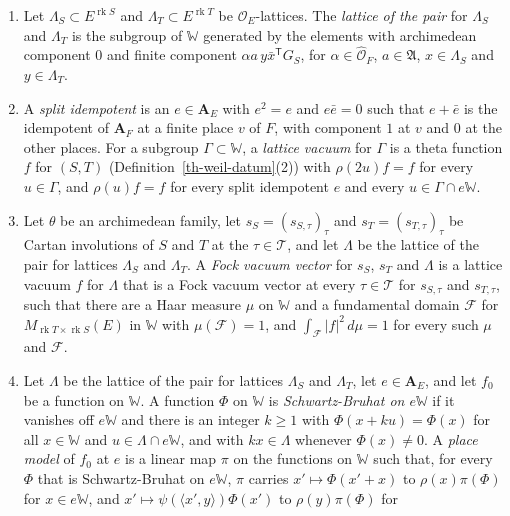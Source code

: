 \begin{definition}
\begin{enumerate}
{  $\tau$} for $s_S$ and $s_T$ if $a_\tau(z)f=0$ for every $z$.
\item Let $\Lambda_S\subset E^{\operatorname{rk}S}$ and
  $\Lambda_T\subset E^{\operatorname{rk}T}$ be $\mathcal O_E$-lattices. The
  \emph{lattice of the pair} for $\Lambda_S$ and $\Lambda_T$ is the subgroup of
  $\mathbb W$ generated by the elements with archimedean component $0$ and
  finite component $\alpha a\,y\bar x^{\mathsf T}G_S$, for
  $\alpha\in\hat{\mathcal O}_F$, $a\in\mathfrak A$, $x\in\Lambda_S$ and
  $y\in\Lambda_T$.
\item A \emph{split idempotent} is an $e\in\mathbf A_E$ with $e^2=e$ and
  $e\bar e=0$ such that $e+\bar e$ is the idempotent of $\mathbf A_F$ at a finite
  place $v$ of $F$, with component $1$ at $v$ and $0$ at the other places. For a
  subgroup $\Gamma\subset\mathbb W$, a \emph{lattice vacuum} for $\Gamma$ is a
  theta function $f$ for $(S,T)$ (Definition~\ref{th-weil-datum}(2)) with
  $\rho(2u)f=f$ for every $u\in\Gamma$, and $\rho(u)f=f$ for every split
  idempotent $e$ and every $u\in\Gamma\cap e\mathbb W$.
\item Let $\theta$ be an archimedean family, let $s_S=(s_{S,\tau})_\tau$ and
  $s_T=(s_{T,\tau})_\tau$ be Cartan involutions of $S$ and $T$ at the
  $\tau\in\mathcal T$, and let $\Lambda$ be the lattice of the pair for lattices
  $\Lambda_S$ and $\Lambda_T$. A \emph{Fock vacuum vector} for $s_S$, $s_T$ and
  $\Lambda$ is a lattice vacuum $f$ for $\Lambda$ that is a Fock vacuum vector
  at every $\tau\in\mathcal T$ for $s_{S,\tau}$ and $s_{T,\tau}$, such that there
  are a Haar measure $\mu$ on $\mathbb W$ and a fundamental domain $\mathcal F$
  for $M_{\operatorname{rk}T\times\operatorname{rk}S}(E)$ in $\mathbb W$ with
  $\mu(\mathcal F)=1$, and $\int_{\mathcal F}|f|^2\,d\mu=1$ for every such $\mu$
  and $\mathcal F$.
\item Let $\Lambda$ be the lattice of the pair for lattices $\Lambda_S$ and
  $\Lambda_T$, let $e\in\mathbf A_E$, and let $f_0$ be a function on
  $\mathbb W$. A function $\Phi$ on $\mathbb W$ is \emph{Schwartz-Bruhat on
  $e\mathbb W$} if it vanishes off $e\mathbb W$ and there is an integer
  $k\geq1$ with $\Phi(x+ku)=\Phi(x)$ for all $x\in\mathbb W$ and
  $u\in\Lambda\cap e\mathbb W$, and with $kx\in\Lambda$ whenever
  $\Phi(x)\neq0$. A \emph{place model} of $f_0$ at $e$ is a linear map $\pi$
  on the functions on $\mathbb W$ such that, for every $\Phi$ that is
  Schwartz-Bruhat on $e\mathbb W$, $\pi$ carries $x'\mapsto\Phi(x'+x)$ to
  $\rho(x)\pi(\Phi)$ for $x\in e\mathbb W$, and
  $x'\mapsto\psi(\langle x',y\rangle)\Phi(x')$ to $\rho(y)\pi(\Phi)$ for

\end{enumerate}
\end{definition}
